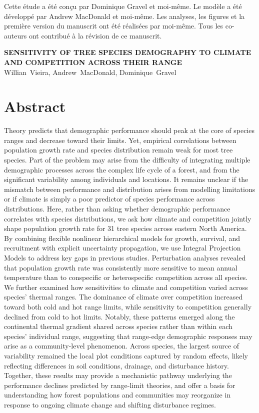 Cette étude a été conçu par Dominique Gravel et moi-même. Le modèle a
été développé par Andrew MacDonald et moi-même. Les analyses, les
figures et la première version du manuscrit ont été réalisées par
moi-même. Tous les co-auteurs ont contribué à la révision de ce
manuscrit.\\

\vfill{}
\pagebreak

\begin{center}
\textbf{\MakeUppercase{Sensitivity of tree species demography to climate
and competition across their range}} \\
Willian~Vieira, Andrew~MacDonald, Dominique~Gravel
\end{center}

\section{Abstract}

Theory predicts that demographic performance should peak at the core of
species ranges and decrease toward their limits. Yet, empirical
correlations between population growth rate and species distribution
remain weak for most tree species. Part of the problem may arise from
the difficulty of integrating multiple demographic processes across the
complex life cycle of a forest, and from the significant variability
among individuals and locations. It remains unclear if the mismatch
between performance and distribution arises from modelling limitations
or if climate is simply a poor predictor of species performance across
distributions. Here, rather than asking whether demographic performance
correlates with species distributions, we ask how climate and
competition jointly shape population growth rate for 31 tree species
across eastern North America. By combining flexible nonlinear
hierarchical models for growth, survival, and recruitment with explicit
uncertainty propagation, we use Integral Projection Models to address
key gaps in previous studies. Perturbation analyses revealed that
population growth rate was consistently more sensitive to mean annual
temperature than to conspecific or heterospecific competition across all
species. We further examined how sensitivities to climate and
competition varied across species' thermal ranges. The dominance of
climate over competition increased toward both cold and hot range
limits, while sensitivity to competition generally declined from cold to
hot limits. Notably, these patterns emerged along the continental
thermal gradient shared across species rather than within each species'
individual range, suggesting that range-edge demographic responses may
arise as a community-level phenomenon. Across species, the largest
source of variability remained the local plot conditions captured by
random effects, likely reflecting differences in soil conditions,
drainage, and disturbance history. Together, these results may provide a
mechanistic pathway underlying the performance declines predicted by
range-limit theories, and offer a basis for understanding how forest
populations and communities may reorganize in response to ongoing
climate change and shifting disturbance regimes.\\

